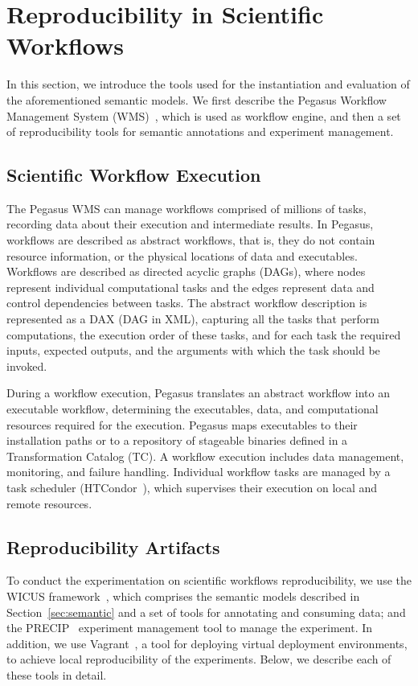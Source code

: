 \section{Reproducibility in Scientific Workflows}
\label{sec:reproducibility}

In this section, we introduce the tools used for the instantiation and evaluation 
of the aforementioned semantic models. We first describe the Pegasus Workflow 
Management System (WMS)~\cite{Deelman-FGCS-2014}, which is used as 
workflow engine, and then a set of reproducibility tools for semantic annotations and 
experiment management.


\subsection{Scientific Workflow Execution}

The Pegasus WMS can manage workflows comprised of millions of tasks, recording data 
about their execution and intermediate results. In Pegasus, workflows are described as 
abstract workflows, that is, they do not contain resource information, or the physical locations of 
data and executables. Workflows are described as directed acyclic graphs (DAGs), where 
nodes represent individual computational tasks and the edges represent data and control 
dependencies between tasks. The abstract workflow description is represented as a DAX 
(DAG in XML), capturing all the tasks that perform computations, the execution order of these 
tasks, and for each task the required inputs, expected outputs, and the arguments with which 
the task should be invoked. 

During a workflow execution, Pegasus translates an abstract workflow into an 
executable workflow, determining the executables, data, and computational resources 
required for the execution. Pegasus maps executables to their installation paths or to a 
repository of stageable binaries defined in a Transformation Catalog (TC). A workflow 
execution includes data management, monitoring, and failure handling. Individual workflow 
tasks are managed by a task scheduler (HTCondor~\cite{condor}), which supervises their 
execution on local and remote resources.


\subsection{Reproducibility Artifacts}

To conduct the experimentation on scientific workflows reproducibility, we 
use the WICUS framework~\cite{wicus}, which comprises the semantic models described 
in Section~\ref{sec:semantic} and a set of tools for annotating and consuming data; and 
the PRECIP~\cite{Azarnoosh-CRC-2013} experiment management tool to manage the 
experiment. In addition, we use Vagrant~\cite{palat2012introducing}, a tool for deploying virtual
deployment environments,  to achieve local reproducibility of the experiments. 
Below, we describe each of these tools in detail.


